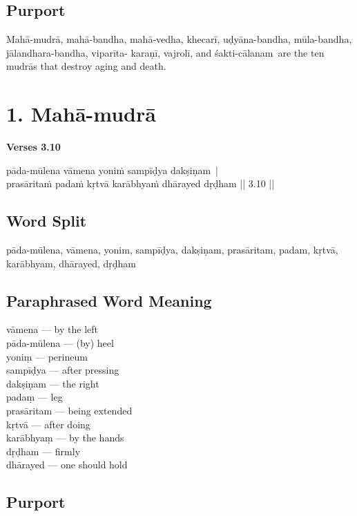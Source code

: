 \subsection*{Purport}

Mahā-mudrā,  mahā-bandha,  mahā-vedha,  khecarī, uḍyāna-bandha, mūla-bandha, jālandhara-bandha, viparīta- karaṇī, vajrolī, and  śakti-cālanam are the ten mudrās that destroy  aging and death.

\section*{1. Mahā-mudrā }

\noindent \textbf{Verses 3.10}

\begin{shloka}
pāda-mūlena vāmena yoniṁ sampīḍya dakṣiṇam |\\
prasāritaṁ padaṁ kṛtvā karābhyaṁ dhārayed dṛḍham || 3.10 ||
\end{shloka}

\subsection*{Word Split}

pāda-mūlena, vāmena, yonim, sampīḍya, dakṣiṇam, prasāritam, padam, kṛtvā, karābhyam, dhārayed, dṛḍham

\subsection*{Paraphrased Word Meaning}

\begin{multicols}{2}
vāmena --- by the left \\
pāda-mūlena --- (by) heel \\
yoniṃ --- perineum \\
sampīḍya --- after pressing\\
dakṣiṇam --- the right \\
padaṃ --- leg\\
prasāritam --- being extended  \\
kṛtvā --- after doing \\
karābhyaṃ --- by the hands \\
dṛḍham --- firmly \\
dhārayed --- one should hold 
\end{multicols}

\subsection*{Purport}

